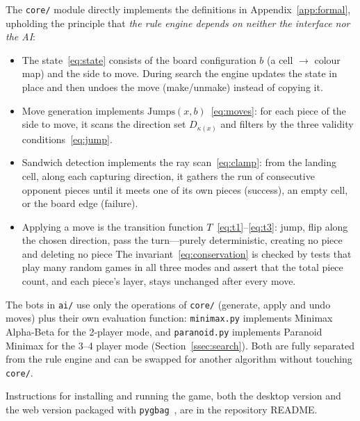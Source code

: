 The \texttt{core/} module directly implements the definitions in
Appendix~\ref{app:formal}, upholding the principle that \emph{the rule
engine depends on neither the interface nor the AI}:
\begin{itemize}[noitemsep,topsep=2pt]
  \item The state~\eqref{eq:state} consists of the board configuration $b$
        (a cell $\to$ colour map) and the side to move. During search the
        engine updates the state in place and then undoes the move
        (make/unmake) instead of copying it.
  \item Move generation implements $\mathrm{Jumps}(x,b)$~\eqref{eq:moves}:
        for each piece of the side to move, it scans the direction set
        $D_{\kappa(x)}$ and filters by the three validity
        conditions~\eqref{eq:jump}.
  \item Sandwich detection implements the ray scan~\eqref{eq:clamp}: from
        the landing cell, along each capturing direction, it gathers the run
        of consecutive opponent pieces until it meets one of its own pieces
        (success), an empty cell, or the board edge (failure).
  \item Applying a move is the transition function
        $T$~\eqref{eq:t1}--\eqref{eq:t3}: jump, flip along the chosen
        direction, pass the turn---purely deterministic, creating no piece
        and deleting no piece The invariant~\eqref{eq:conservation} is
        checked by tests that play many random games in all three modes and
        assert that the total piece count, and each piece's layer, stays
        unchanged after every move.
\end{itemize}
The bots in \texttt{ai/} use only the operations of \texttt{core/}
(generate, apply and undo moves) plus their own evaluation function: \texttt{minimax.py} implements Minimax Alpha-Beta for
the 2-player mode, and \texttt{paranoid.py} implements Paranoid Minimax for
the 3--4 player mode (Section~\ref{ssec:search}). Both are fully separated from the rule engine and can be
swapped for another algorithm without touching \texttt{core/}.

Instructions for installing and running the game, both the desktop version
and the web version packaged with \texttt{pygbag}~\citep{pygbag}, are in the
repository README.

